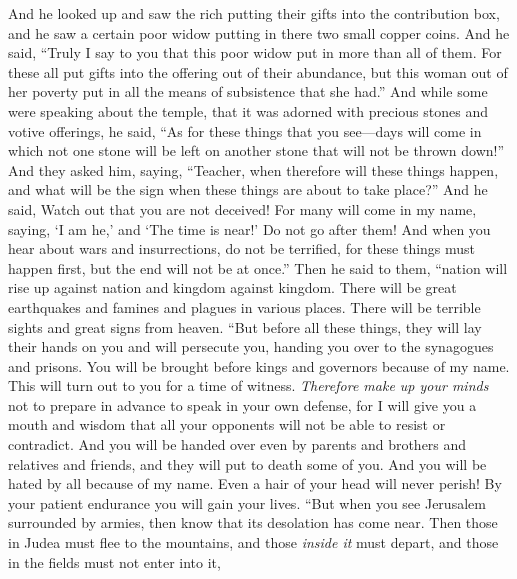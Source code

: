 \begin{biblechapter} %
 And he looked up and saw the rich putting their gifts into the contribution box,
\verse and he saw a certain poor widow putting in there two small copper coins.
\verse And he said, “Truly I say to you that this poor widow put in more than all of them.
\verse For these all put gifts into the offering out of their abundance, but this woman out of her poverty put in all the means of subsistence that she had.”
 And while some were speaking about the temple, that it was adorned with precious stones and votive offerings, he said,
\verse “As for these things that you see—days will come in which not one stone will be left on another stone that will not be thrown down!”
 And they asked him, saying, “Teacher, when therefore will these things happen, and what will be the sign when these things are about to take place?”
\verse And he said, Watch out that you are not deceived! For many will come in my name, saying, ‘I am he,’ and ‘The time is near!’ Do not go after them!
\verse And when you hear about wars and insurrections, do not be terrified, for these things must happen first, but the end will not be at once.”
\verse Then he said to them, “nation will rise up against nation and kingdom against kingdom.
\verse There will be great earthquakes and famines and plagues in various places. There will be terrible sights and great signs from heaven.
 “But before all these things, they will lay their hands on you and will persecute you, handing you over to the synagogues and prisons. You will be brought before kings and governors because of my name.
\verse This will turn out to you for a time of witness.
\verse \textit{Therefore make up your minds} not to prepare in advance to speak in your own defense,
\verse for I will give you a mouth and wisdom that all your opponents will not be able to resist or contradict.
\verse And you will be handed over even by parents and brothers and relatives and friends, and they will put to death some of you.
\verse And you will be hated by all because of my name.
\verse Even a hair of your head will never perish!
\verse By your patient endurance you will gain your lives.
 “But when you see Jerusalem surrounded by armies, then know that its desolation has come near.
\verse Then those in Judea must flee to the mountains, and those \textit{inside it} must depart, and those in the fields must not enter into it,

\end{biblechapter}
